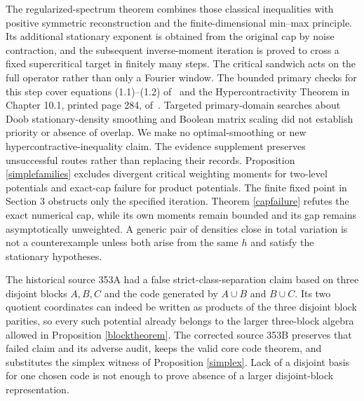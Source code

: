 \documentclass[11pt]{article}
\begin{document}
The regularized-spectrum theorem combines those classical inequalities with
positive symmetric reconstruction and the finite-dimensional min--max
principle. Its additional stationary exponent is obtained from the original
cap by noise contraction, and the subsequent inverse-moment iteration is
proved to cross a fixed supercritical target in finitely many steps.
The critical sandwich acts on the full operator rather than only a Fourier
window. The bounded primary checks for this step cover equations (1.1)--(1.2)
of~\cite{mos} and the Hypercontractivity Theorem in Chapter 10.1, printed
page 284, of~\cite{odonnell}. Targeted primary-domain searches about Doob
stationary-density smoothing and Boolean matrix scaling did not establish
priority or absence of overlap. We make no optimal-smoothing or new
hypercontractive-inequality claim.
The evidence supplement preserves unsuccessful routes rather than replacing their records. Proposition \ref{simplefamilies} excludes divergent critical weighting moments for two-level potentials and exact-cap failure for product potentials. The finite fixed point in Section 3 obstructs only the specified iteration. Theorem \ref{capfailure} refutes the exact numerical cap, while its own moments remain bounded and its gap remains asymptotically unweighted. A generic pair of densities close in total variation is not a counterexample unless both arise from the same $h$ and satisfy the stationary hypotheses.

The historical source 353A had a false strict-class-separation claim based on three disjoint blocks $A,B,C$ and the code generated by $A\cup B$ and $B\cup C$. Its two quotient coordinates can indeed be written as products of the three disjoint block parities, so every such potential already belongs to the larger three-block algebra allowed in Proposition \ref{blocktheorem}. The corrected source 353B preserves that failed claim and its adverse audit, keeps the valid core code theorem, and substitutes the simplex witness of Proposition \ref{simplex}. Lack of a disjoint basis for one chosen code is not enough to prove absence of a larger disjoint-block representation.
\end{document}

